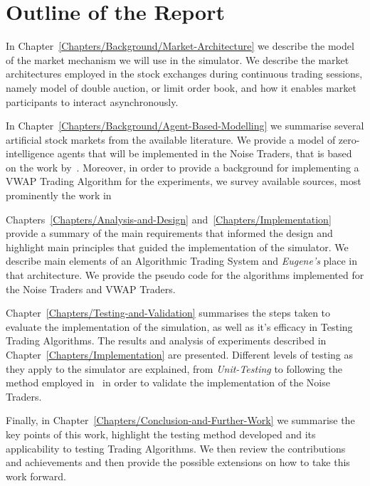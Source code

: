 \section{Outline of the Report \label{Chapters/Introduction/Outline}}

In Chapter~\ref{Chapters/Background/Market-Architecture} we describe the model of the market mechanism we will use in the simulator. We describe the market architectures employed in the stock exchanges during continuous trading sessions, namely model of double auction, or limit order book, and how it enables market participants to interact asynchronously.

In Chapter~\ref{Chapters/Background/Agent-Based-Modelling} we summarise several artificial stock markets from the available literature. We provide a model of zero-intelligence agents that will be implemented in the Noise Traders, that is based on the work by~\citet[chap.~4]{Gilles2006}. Moreover, in order to provide a background for implementing a VWAP Trading Algorithm for the experiments, we survey available sources, most prominently the work in~\cite{Coggins2006, Kakade2004} 

Chapters~\ref{Chapters/Analysis-and-Design} and~\ref{Chapters/Implementation} provide a summary of the main requirements that informed the design and highlight main principles that guided the implementation of the simulator. We describe main elements of an Algorithmic Trading System and \textit{Eugene's} place in that architecture. We provide the pseudo code for the algorithms implemented for the Noise Traders and VWAP Traders.

Chapter~\ref{Chapters/Testing-and-Validation} summarises the steps taken to evaluate the implementation of the simulation, as well as it's efficacy in Testing Trading Algorithms. The results and analysis of experiments described in Chapter~\ref{Chapters/Implementation} are presented. Different levels of testing as they apply to the simulator are explained, from \textit{Unit-Testing} to following the method employed in~\cite[chap.~4]{Gilles2006} in order to validate the implementation of the Noise Traders.

Finally, in Chapter~\ref{Chapters/Conclusion-and-Further-Work} we summarise the key points of this work, highlight the testing method developed and its applicability to testing Trading Algorithms. We then review the contributions and achievements and then provide the possible extensions on how to take this work forward.



